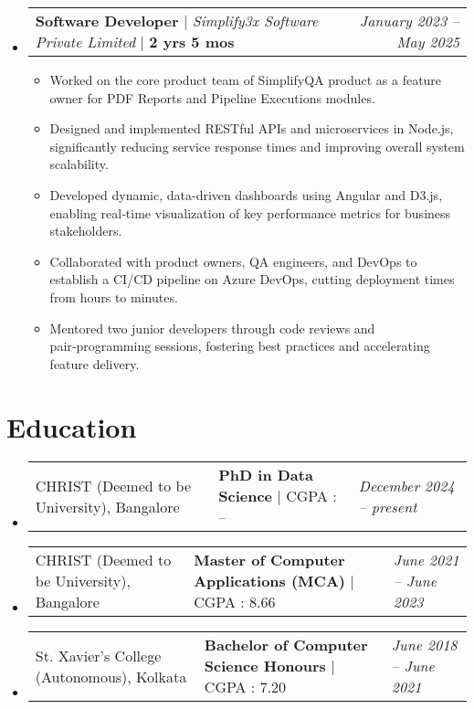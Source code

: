 \documentclass[letterpaper,10pt]{article}
\makeatletter
\newcommand{\subheadingtitlevspace}{\vspace{-3pt}}
\newcommand{\resumeItem}[1]{\item{#1 \vspace{-4pt}}}
\newcommand{\titleItem}[1]{\textbf{#1}}
\newcommand{\resumeSubheading}[4]{
  \item
    \begin{tabular*}{0.97\textwidth}[t]{l@{\extracolsep{\fill}}l@{}l}     
      {#1} & \titleItem{#3} | {#2} & \textit{#4}\\
    \end{tabular*}\vspace{-10pt}
}
\newcommand{\resumeProjectHeading}[2]{
    \item
    \begin{tabular*}{0.97\textwidth}{l@{\extracolsep{\fill}}r}
        #1 & \textit{ #2} \\
    \end{tabular*}\vspace{-9pt}
}
\newcommand{\resumeSubHeadingListStart}{\subheadingtitlevspace\begin{itemize}[leftmargin=0.15in, label={}]}
\newcommand{\resumeSubHeadingListEnd}{\end{itemize}}
\newcommand{\resumeItemListStart}{\begin{itemize}}
\newcommand{\resumeItemListEnd}{\end{itemize}\vspace{-8pt}}
\makeatother
\begin{document}
\resumeSubHeadingListStart
\resumeProjectHeading{\titleItem{Software Developer} $|$ \emph{Simplify3x Software Private Limited} $|$ \textbf{2 yrs 5 mos}}{January 2023 -- May 2025} 
    \resumeItemListStart
        \resumeItem{Worked on the core product team of SimplifyQA product as a feature owner for PDF Reports and Pipeline Executions modules.}
        \resumeItem{Designed and implemented RESTful APIs and microservices in Node.js, significantly reducing service response times and improving overall system scalability.}
        \resumeItem{Developed dynamic, data-driven dashboards using Angular and D3.js, enabling real‑time visualization of key performance metrics for business stakeholders.}
        \resumeItem{Collaborated with product owners, QA engineers, and DevOps to establish a CI/CD pipeline on Azure DevOps, cutting deployment times from hours to minutes.}
        \resumeItem{Mentored two junior developers through code reviews and pair‑programming sessions, fostering best practices and accelerating feature delivery.}
    \resumeItemListEnd
\resumeSubHeadingListEnd


\section{Education}
\resumeSubHeadingListStart
    \resumeSubheading{CHRIST (Deemed to be University), Bangalore}{CGPA : --}{PhD in Data Science}{December 2024 -- present}
    \vspace{0.5em}
    \resumeSubheading{CHRIST (Deemed to be University), Bangalore}{CGPA : 8.66}{Master of Computer Applications (MCA)}{June 2021 -- June 2023}
    \vspace{0.5em}
    \resumeSubheading{St. Xavier's College (Autonomous), Kolkata}{CGPA : 7.20}{Bachelor of Computer Science Honours}{June 2018 -- June 2021}
    \vspace{0.5em}
\resumeSubHeadingListEnd
\vspace{-8pt}

\end{document}
